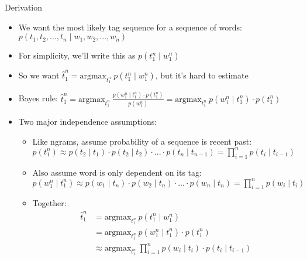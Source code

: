 \documentclass[11pt,letterpaper]{article}
\begin{document}
Derivation

\begin{itemize}
  \item We want the most likely tag sequence for a sequence of words: 
        $p(t_1, t_2, ..., t_n \mid w_1, w_2, ..., w_n)$
  \item For simplicity, we'll write this as $p(t_1^n \mid w_1^n)$
  \item So we want  $\hat{t}_1^n = \text{argmax}_{t_1^n}~p(t_1^n \mid w_1^n)$, but it's hard to estimate
  \item Bayes rule: $\hat{t}_1^n = \text{argmax}_{t_1^n}~\frac{p(w_1^n \mid t_1^n) \cdot p(t_1^n)}{p(w_1^n)}
                                 = \text{argmax}_{t_1^n}~p(w_1^n \mid t_1^n) \cdot p(t_1^n)$
  \item Two major independence assumptions:
    \begin{itemize}
      \item Like ngrams, assume probability of a sequence is recent past: \vspace{2mm} \\
            $p(t_1^n) \approx p(t_2 \mid t_1) \cdot 
                              p(t_2 \mid t_2) \cdot 
                              ...  \cdot 
                              p(t_n \mid t_{n-1})
                       = \prod_{i=1}^n p(t_i \mid t_{i-1})$
      \item Also assume word is only dependent on its tag: \vspace{2mm} \\
            $p(w_1^n \mid t_1^n) \approx p(w_1 \mid t_n) \cdot 
                                         p(w_2 \mid t_n) \cdot 
                                         ...  \cdot 
                                         p(w_n \mid t_n)
                                 = \prod_{i=1}^n p(w_i \mid t_i)$
      \item Together: 
        \begin{align*}
        \hat{t}_1^n &= \text{argmax}_{t_1^n}~p(t_1^n \mid w_1^n) \\
                    &= \text{argmax}_{t_1^n}~p(w_1^n \mid t_1^n) \cdot p(t_1^n) \\
                    &\approx \text{argmax}_{t_1^n}~\prod_{i=1}^n p(w_i \mid t_i) \cdot p(t_i \mid t_{i-1})
        \end{align*}
    \end{itemize}
\end{itemize}
\end{document}
